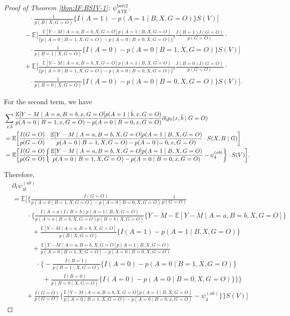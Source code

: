 \documentclass[10pt]{article}
\begin{document}
\begin{proof}[Proof of Theorem \ref{thm:IF:BSIV-1}: $\psi_{\text{ATE}}^{\text{bsiv2}}$]
{\begin{align*}
    &\ \ \ \ \ \ \ \ \cdot\frac{1}{p(B\mid X,G=O)}\{I(A=1)-p(A=1\mid B,X,G=O)\}S(V)\bigg]\\
    &\ \ \ \ -\mathbb{E}\bigg[\frac{\mathbb{E}[Y-M\mid A=a,B=b,X,G=O]p(A=1\mid B,X,G=O)}{\{p(A=0\mid B=1,X,G=O)-p(A=0\mid B=0,X,G=O)\}^2}\frac{I(B=1)I(G=O)}{p(G=O)}\cdot\\
    &\ \ \ \ \ \ \ \ \cdot\frac{1}{p(B=1\mid X, G=O)}\{I(A=0)-p(A=0\mid B=1,X,G=O)\}S(V)\bigg]\\
    &\ \ \ \ +\mathbb{E}\bigg[\frac{\mathbb{E}[Y-M\mid A=a,B=b,X,G=O]p(A=1\mid B,X,G=O)}{\{p(A=0\mid B=1,X,G=O)-p(A=0\mid B=0,X,G=O)\}^2}\frac{I(B=0)I(G=O)}{p(G=O)}\cdot\\
    &\ \ \ \ \ \ \ \ \cdot\frac{1}{p(B=0\mid X, G=O)}\{I(A=0)-p(A=0\mid B=0,X,G=O)\}S(V)\bigg].
\end{align*}}

For the second term, we have
\begin{align*}
    &\sum_{x,\Tilde{b}}\frac{\mathbb{E}[Y-M\mid A=a,B=b,x,G=O]p(A=1\mid \Tilde{b},x,G=O)}{p(A=0\mid B=1,x,G=O)-p(A=0\mid B=0,x,G=O)}\partial_tp_t(x,\Tilde{b}\mid G=O)\\
    &=\mathbb{E}\bigg[\frac{I(G=O)}{p(G=O)}\cdot\frac{\mathbb{E}[Y-M\mid A=a,B=b,X,G=O]p(A=1\mid B,X,G=O)}{p(A=0\mid B=1,X,G=O)-p(A=0\mid =0,x,G=O)}\cdot S(X,B\mid G)\bigg]\\
    &=\mathbb{E}\bigg[\frac{I(G=O)}{p(G=O)}\bigg\{\frac{\mathbb{E}[Y-M\mid A=a,B=b,X,G=O]p(A=1\mid B,X,G=O)}{p(A=0\mid B=1,X,G=O)-p(A=0\mid B=0,x,G=O)}-\psi_{4}^{(ab)}\bigg\}\cdot S(V)\bigg].
\end{align*}

Therefore,
{\footnotesize \begin{align*}
    &\partial_t\psi_{4t}^{(ab)}\\
    &=\mathbb{E}\Bigg[\Bigg\{\frac{I(G=O)}{p(A=0\mid B=1,X,G=O)-p(A=0\mid B=0,X,G=O)}\frac{1}{p(G=O)}\\
    &\ \ \ \ \ \ \ \ \ \ \cdot\bigg\{\frac{I(A=a)I(B=b)p(A=1\mid B,X,G=O)}{p(A=a\mid B=b,X,G=O)p(B=b\mid X,G=O)}\{Y-M-\mathbb{E}[Y-M\mid A=a,B=b,X,G=O]\}\\
    &\ \ \ \ \ \ \ \ \ \ \ \ \ +\frac{\mathbb{E}[Y-M\mid A=a,B=b,X,G=O]}{p(B\mid X,G=O)}\big\{I(A=1)-p(A=1\mid B,X,G=O)\big\}\\
    &\ \ \ \ \ \ \ \ \ \ \ \ \ +\frac{\mathbb{E}[Y-M\mid A=a,B=b,X,G=O]p(A=1\mid B,X,G=O)}{p(A=0\mid B=1,X,G=O)-p(A=0\mid B=0,X,G=O)}\\
    &\ \ \ \ \ \ \ \ \ \ \ \ \ \ \ \ \cdot\big\{-\frac{I(B=1)}{p(B=1\mid X, G=O)}\{I(A=0)-p(A=0\mid B=1,X,G=O)\}\\
    &\ \ \ \ \ \ \ \ \ \ \ \ \ \ \ \ \ \ \ \ +\frac{I(B=0)}{p(B=0\mid X, G=O)}\{I(A=0)-p(A=0\mid B=0,X,G=O)\}\big\}\bigg\}\\
    &\ \ \ \ \ \ \ \ \  +\frac{I(G=O)}{p(G=O)}\bigg\{\frac{\mathbb{E}[Y-M\mid A=a,B=b,X,G=O]p(A=1\mid B,X,G=O)}{p(A=0\mid B=1,X,G=O)-p(A=0\mid B=0,x,G=O)}-\psi_4^{(ab)}\bigg\}\Bigg\}S(V)\Bigg]
\end{align*}}


\end{proof}
\end{document}
